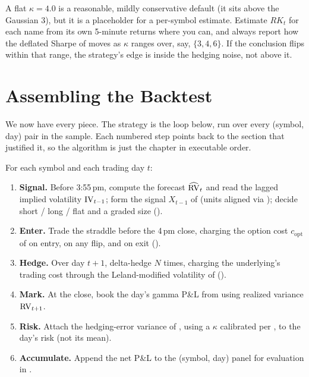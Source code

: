 \begin{warning}[$\kappa = 4.0$ Is a Convention, Not a Measurement]
A flat $\kappa = 4.0$ is a reasonable, mildly conservative default (it sits above the Gaussian $3$), but it is a placeholder for a per-symbol estimate. Estimate $RK_t$ for each name from its own 5-minute returns where you can, and always report how the deflated Sharpe of  moves as $\kappa$ ranges over, say, $\{3, 4, 6\}$. If the conclusion flips within that range, the strategy's edge is inside the hedging noise, not above it.
\end{warning}

\section{Assembling the Backtest}
\label{sec:ivrv:algorithm}

We now have every piece. The strategy is the loop below, run over every (symbol, day) pair in the sample. Each numbered step points back to the section that justified it, so the algorithm is just the chapter in executable order.

\begin{keyidea}
For each symbol and each trading day $t$:
\begin{enumerate}
  \item \textbf{Signal.} Before 3:55\,pm, compute the forecast $\widehat{\operatorname{RV}}_t$ and read the lagged implied volatility $\operatorname{IV}_{t-1}$; form the signal $X_{t-1}$ of  (units aligned via ); decide short / long / flat and a graded size ().
  \item \textbf{Enter.} Trade the straddle before the 4\,pm close, charging the option cost $c_{\text{opt}}$ of  on entry, on any flip, and on exit ().
  \item \textbf{Hedge.} Over day $t+1$, delta-hedge $N$ times, charging the underlying's trading cost through the Leland-modified volatility of  ().
  \item \textbf{Mark.} At the close, book the day's gamma P\&L from  using realized variance $\operatorname{RV}_{t+1}$.
  \item \textbf{Risk.} Attach the hedging-error variance of , using a $\kappa$ calibrated per , to the day's risk (not its mean).
  \item \textbf{Accumulate.} Append the net P\&L to the (symbol, day) panel for evaluation in .
\end{enumerate}
\end{keyidea}

